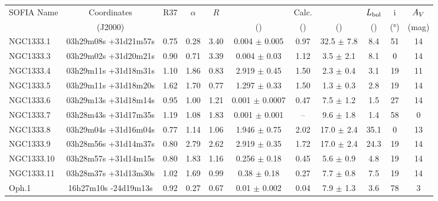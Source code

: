 \begin{landscape}
\begin{table}[!h]
\scriptsize
\caption[Fitted parameters]{Fitted parameters for the point sources in Ophiuchus and NGC1333 where long-wavelength photometry is available.}
\label{tab:FittedParameters}
\vspace{-0.5cm}
\hspace*{-1.5cm}
\begin{center}
\begin{longtable}{lcccccccccc}

\toprule																									
SOFIA Name	&	Coordinates	&	R37	&	$\alpha$	&	$R$	&	\Menv			&	Calc. \Menv	&	\Ltot			&	$L_\textrm{bol}$	&	i	&	$A_V$	\\
	&	(J2000)	&		&		&		&	(\si{\Msun})			&	(\si{\Msun})	&	(\si{\Lsun})			&	(\si{\Lsun})	&	(\si{\degree})	&	(mag)	\\
\midrule																									
NGC1333.1	&	03h29m08s +31d21m57s	&	0.75	&	0.28	&	3.40	&	0.004	$\pm$	0.005	&	0.97	&	32.5	$\pm$	7.8	&	8.4	&	51	&	14	\\
NGC1333.3	&	03h29m02s +31d20m21s	&	0.90	&	0.71	&	3.39	&	0.004	$\pm$	0.03	&	1.12	&	3.5	$\pm$	2.1	&	8.1	&	0	&	14	\\
NGC1333.4	&	03h29m11s +31d18m31s	&	1.10	&	1.86	&	0.83	&	2.919	$\pm$	0.45	&	1.50	&	2.3	$\pm$	0.4	&	3.1	&	19	&	11	\\
NGC1333.5	&	03h29m11s +31d18m20s	&	1.62	&	1.70	&	0.77	&	1.297	$\pm$	0.33	&	1.50	&	1.3	$\pm$	0.3	&	2.8	&	19	&	14	\\
NGC1333.6	&	03h29m13s +31d18m14s	&	0.95	&	1.00	&	1.21	&	0.001	$\pm$	0.0007	&	0.47	&	7.5	$\pm$	1.2	&	1.5	&	27	&	14	\\
NGC1333.7	&	03h28m43s +31d17m35s	&	1.19	&	1.08	&	1.83	&	0.001	$\pm$	0.001	&	--	&	9.6	$\pm$	1.8	&	1.4	&	58	&	0	\\
NGC1333.8	&	03h29m04s +31d16m04s	&	0.77	&	1.14	&	1.06	&	1.946	$\pm$	0.75	&	2.02	&	17.0	$\pm$	2.4	&	35.1	&	0	&	13	\\
NGC1333.9	&	03h28m56s +31d14m37s	&	0.80	&	2.79	&	2.62	&	2.919	$\pm$	0.35	&	1.72	&	17.0	$\pm$	2.4	&	24.3	&	19	&	14	\\
NGC1333.10	&	03h28m57s +31d14m15s	&	0.80	&	1.83	&	1.16	&	0.256	$\pm$	0.18	&	0.45	&	5.6	$\pm$	0.9	&	4.8	&	19	&	14	\\
NGC1333.11	&	03h28m37s +31d13m30s	&	1.02	&	1.69	&	0.99	&	0.38	$\pm$	0.18	&	0.27	&	7.7	$\pm$	0.8	&	7.5	&	19	&	14	\\
Oph.1	&	16h27m10s -24d19m13s	&	0.92	&	0.27	&	0.67	&	0.01	$\pm$	0.002	&	0.04	&	7.9	$\pm$	1.3	&	3.6	&	78	&	3	\\

\end{longtable}
\end{center}
\end{table}
\end{landscape}

